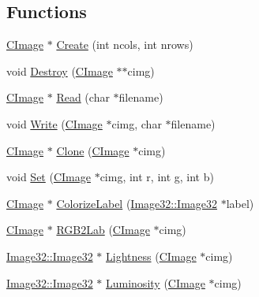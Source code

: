 \subsection*{Functions}
\begin{DoxyCompactItemize}
\item 
\hyperlink{namespacegft_1_1CImage_ae3efa12a0ed0755314837d3e5c974556}{C\-Image} $\ast$ \hyperlink{namespacegft_1_1CImage_a6ca3feb88ebee636f0313cdc577c19c7}{Create} (int ncols, int nrows)
\item 
void \hyperlink{namespacegft_1_1CImage_aaec1f4c104e5af5f9e1bb8f66fc25ab9}{Destroy} (\hyperlink{namespacegft_1_1CImage_ae3efa12a0ed0755314837d3e5c974556}{C\-Image} $\ast$$\ast$cimg)
\item 
\hyperlink{namespacegft_1_1CImage_ae3efa12a0ed0755314837d3e5c974556}{C\-Image} $\ast$ \hyperlink{namespacegft_1_1CImage_a4642a6abc36f983a43599ab73b2d0600}{Read} (char $\ast$filename)
\item 
void \hyperlink{namespacegft_1_1CImage_a83286d59c0a9dbf712da5326bf4dd719}{Write} (\hyperlink{namespacegft_1_1CImage_ae3efa12a0ed0755314837d3e5c974556}{C\-Image} $\ast$cimg, char $\ast$filename)
\item 
\hyperlink{namespacegft_1_1CImage_ae3efa12a0ed0755314837d3e5c974556}{C\-Image} $\ast$ \hyperlink{namespacegft_1_1CImage_afa4b209d5ad1cd4302cc737783e4ca3a}{Clone} (\hyperlink{namespacegft_1_1CImage_ae3efa12a0ed0755314837d3e5c974556}{C\-Image} $\ast$cimg)
\item 
void \hyperlink{namespacegft_1_1CImage_a958264d45e7dfe021dd38cd6cf48bf46}{Set} (\hyperlink{namespacegft_1_1CImage_ae3efa12a0ed0755314837d3e5c974556}{C\-Image} $\ast$cimg, int r, int g, int b)
\item 
\hyperlink{namespacegft_1_1CImage_ae3efa12a0ed0755314837d3e5c974556}{C\-Image} $\ast$ \hyperlink{namespacegft_1_1CImage_a112aed74166b2aed4cc1211ec560b1fa}{Colorize\-Label} (\hyperlink{namespacegft_1_1Image32_a6c5a03566b593bb406f1fe33266a0382}{Image32\-::\-Image32} $\ast$label)
\item 
\hyperlink{namespacegft_1_1CImage_ae3efa12a0ed0755314837d3e5c974556}{C\-Image} $\ast$ \hyperlink{namespacegft_1_1CImage_a522ff849c4246bc504fd0a5e142b2b5f}{R\-G\-B2\-Lab} (\hyperlink{namespacegft_1_1CImage_ae3efa12a0ed0755314837d3e5c974556}{C\-Image} $\ast$cimg)
\item 
\hyperlink{namespacegft_1_1Image32_a6c5a03566b593bb406f1fe33266a0382}{Image32\-::\-Image32} $\ast$ \hyperlink{namespacegft_1_1CImage_a8ed35a5fcb90e9e8fa2bcdcd9b1bdc55}{Lightness} (\hyperlink{namespacegft_1_1CImage_ae3efa12a0ed0755314837d3e5c974556}{C\-Image} $\ast$cimg)
\item 
\hyperlink{namespacegft_1_1Image32_a6c5a03566b593bb406f1fe33266a0382}{Image32\-::\-Image32} $\ast$ \hyperlink{namespacegft_1_1CImage_a8386b0c6a183d26e998403dc611d3e3f}{Luminosity} (\hyperlink{namespacegft_1_1CImage_ae3efa12a0ed0755314837d3e5c974556}{C\-Image} $\ast$cimg)
\end{DoxyCompactItemize}


